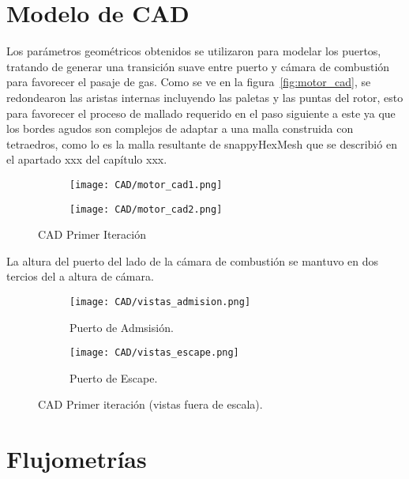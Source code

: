 
\section{Modelo de CAD}
%
Los parámetros geométricos obtenidos se utilizaron para modelar los puertos,
tratando de generar una transición suave entre puerto y cámara de combustión
para favorecer el pasaje de gas.
%
Como se ve en la figura~\ref{fig:motor_cad}, se redondearon las aristas
internas incluyendo las paletas y las puntas del rotor, esto para favorecer el
proceso de mallado requerido en el paso siguiente a este ya que los bordes
agudos son complejos de adaptar a una malla construida con tetraedros, como lo
es la malla resultante de snappyHexMesh que se describió en el apartado xxx del
capítulo xxx.

\begin{figure}
  \centering
    \begin{subfigure}{0.4\textwidth}
        \centering
        \texttt{[image: CAD/motor\_cad1.png]}
    \end{subfigure}
    \hfill
    \begin{subfigure}{0.4\textwidth}
        \centering
        \texttt{[image: CAD/motor\_cad2.png]}
    \end{subfigure}
  \caption{CAD Primer Iteración}\label{fig:motor_cad1}
\end{figure}

La altura del puerto del lado de la cámara de combustión se mantuvo en dos
tercios del a altura de cámara.

\begin{figure}
  \centering
    \begin{subfigure}{0.8\textwidth}
        \centering
        \texttt{[image: CAD/vistas\_admision.png]}
        \caption{Puerto de Admsisión.}
    \end{subfigure}
    \begin{subfigure}{0.8\textwidth}
        \centering
        \texttt{[image: CAD/vistas\_escape.png]}
        \caption{Puerto de Escape.}
    \end{subfigure}
  \caption{CAD Primer iteración (vistas fuera de escala).}\label{fig:motor_cad2}
\end{figure}

\section{Flujometrías}

